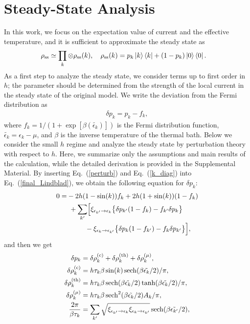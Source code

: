 \documentclass[a4paper, amsfonts, amssymb, amsmath, reprint, showkeys, nofootinbib, twoside,superscriptaddress, prb]{revtex4-2}
\newcommand{\mr}[1]{\mathrm{#1}}
\newcommand{\sk}{\sin(k)}
\newcommand{\epk}{\epsilon_k}
\newcommand{\epkp}{\epsilon_{k'}}
\begin{document}

\section{Steady-State Analysis}
In this work, we focus on the expectation value of current and the effective temperature, and it is sufficient to approximate the steady state as
\begin{align}
\rho_{\mr{ss}}&\simeq \prod_k\otimes\rho_{\mr{ss}}(k),\quad \rho_{\mr{ss}}(k) = p_k \ket{k}\bra{k} + (1-p_k)\ket{0} \bra{0}.\label{k_diag}
\end{align}
As a first step to analyze the steady state, we consider terms up to first order in $h$; the parameter should be determined from the strength of the local current in the steady state of the original model. We write the deviation from the Fermi distribution as
\begin{align}
    \delta p_k = p_k - f_k, \label{perturb}
\end{align}
where $f_k = 1/(1+\exp[\beta(\tilde{\epsilon_k})])$ is the Fermi distribution function, $\tilde{\epsilon_k} = \epk -\mu$, and $\beta$ is the inverse temperature of the thermal bath. Below we consider the small $h$ regime and analyze the steady state by perturbation theory with respect to $h$. Here, we summarize only the assumptions and main results of the calculation, while the detailed derivation is provided in the Supplemental Material\cite{Supple}.
By inserting Eq.~(\ref{perturb}) and Eq.~(\ref{k_diag}) into Eq.~(\ref{final_Lindblad}), we obtain the following equation for $\delta p_k$:
\begin{align}
    0=&-2h(1-\sk)f_k + 2h(1+\sk)(1-f_k)\nonumber\\
    & \  + \sum_{k'}\Bigl[\xi_{\epkp\rightarrow\epk}\bigl\{\delta p_{k'}(1-f_k) - f_{k'}\delta p_k \bigr\}\nonumber\\
    & \ \ \ \ \ \ \ \ -\xi_{\epk\rightarrow\epkp}\bigl\{\delta p_k(1-f_{k'}) - f_{k}\delta p_{k'} \bigr\}\Bigr],\label{ss_equation}
\end{align}
and then we get
\begin{align}
    \delta p_k &= \delta\rho^{(\mr{c})}_k + \delta\rho^{(\mr{th})}_k + \delta\rho^{(\mu)}_k,\label{results}\\%
    \delta\rho^{(\mr{c})}_k&=h \tau_k \beta\sk\sech(\beta\tilde{\epk}/2)/\pi,\label{current_term}\\
    \delta\rho^{(\mr{th})}_k&=h \tau_k\beta\sech(\beta\tilde{\epk}/2)\tanh(\beta\tilde{\epk}/2)/\pi,\label{thermal_term}\\
    \delta\rho^{(\mu)}_k&=h \tau_k \beta\sech^2(\beta\tilde{\epk}/2)A_k/\pi,\label{chemical_potential_term}\\
    \frac{2\pi}{\beta\tau_k} &= \sum_{k'}\sqrt{\xi_{\epkp\rightarrow\epk}\xi_{\epk\rightarrow\epkp}}\sech(\beta\tilde{\epkp}/2),\label{relaxation_time}
\end{align}
\end{document}
